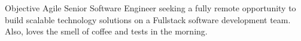 \begin{section}{Objective}
  Agile Senior Software Engineer seeking a fully remote opportunity to build scalable technology solutions on a Fullstack software development team. Also, loves the smell of coffee and tests in the morning.
\end{section}
